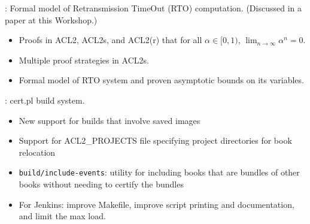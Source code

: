 
\begin{frame}

\newlibtitle

:
Formal model of Retransmission TimeOut (RTO) computation.
(Discussed in a paper at this Workshop.)
\begin{itemize}
\item Proofs in ACL2, ACL2s, and ACL2(r) that for all $\alpha \in [0, 1)$,
      $\lim_{n\to\infty}\alpha^n = 0$.
\item Multiple proof strategies in ACL2s.
\item Formal model of RTO system and proven asymptotic bounds on its variables.
\end{itemize}

\end{frame}


\begin{frame}

\implibtitle

:
cert.pl build system.
\begin{itemize}
\item New support for builds that involve saved images
\item Support for ACL2\_PROJECTS file specifying project directories for book relocation
\item \texttt{build/include-events}: utility for including books that
  are bundles of other books without needing to certify the bundles
\item For Jenkins: improve Makefile, improve script printing and documentation, and limit the max load.
\end{itemize}

\end{frame}


